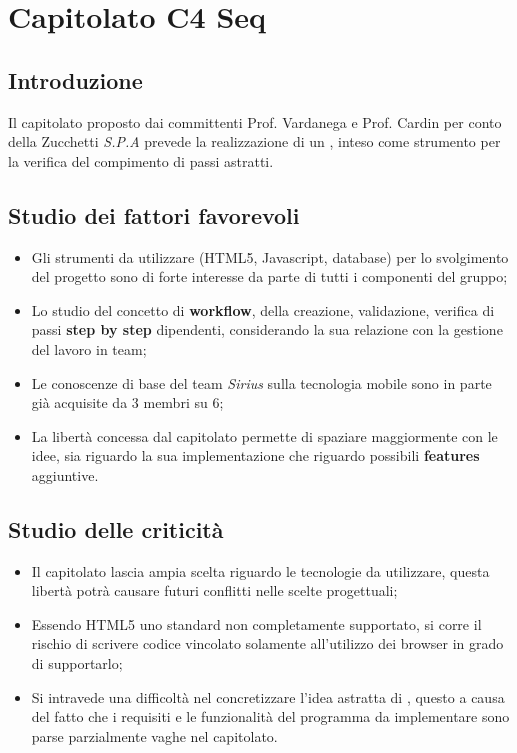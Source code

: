 \section{Capitolato C4 Seq}
\subsection{Introduzione}
Il capitolato proposto dai committenti Prof. Vardanega e Prof. Cardin per conto della Zucchetti \textit{S.P.A} prevede la realizzazione di un \progetto , inteso come strumento per la verifica del compimento di passi astratti.
\subsection{Studio dei fattori favorevoli}
\begin{itemize}
\item Gli strumenti da utilizzare (HTML5, Javascript, database) per lo svolgimento del progetto sono di forte interesse da parte di tutti i componenti del gruppo;
\item Lo studio del concetto di \textbf{workflow}, della creazione, validazione, verifica di passi \textbf{step by step} dipendenti, considerando la sua relazione con la gestione del lavoro in team;
\item Le conoscenze di base del team \textit{Sirius} sulla tecnologia mobile sono in parte già acquisite da 3 membri su 6;
\item La libertà concessa dal capitolato permette di spaziare maggiormente con le idee, sia riguardo la sua implementazione che riguardo possibili \textbf{features} aggiuntive.
\end{itemize}
\subsection{Studio delle criticità}
\begin{itemize}
\item Il capitolato lascia ampia scelta riguardo le tecnologie da utilizzare, questa libertà potrà causare futuri conflitti nelle scelte progettuali;
\item Essendo HTML5 uno standard non completamente supportato, si corre il rischio di scrivere codice vincolato solamente all'utilizzo dei browser in grado di supportarlo;
\item Si intravede una difficoltà nel concretizzare l'idea astratta di \progetto , questo a causa del fatto che i requisiti e le funzionalità del programma da implementare sono parse parzialmente vaghe nel capitolato.
\end{itemize}

